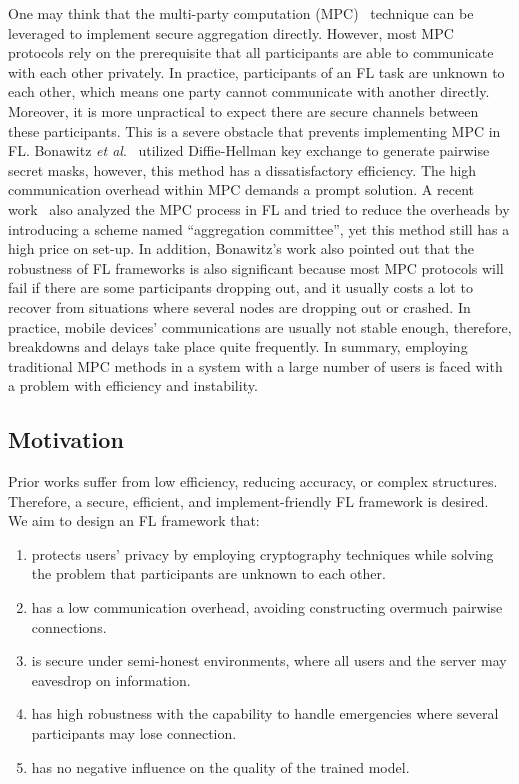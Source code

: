 One may think that the multi-party computation (MPC)~\cite{Yao} technique can be leveraged to implement secure aggregation directly. However, most MPC protocols rely on the prerequisite that all participants are able to communicate with each other privately. In practice, participants of an FL task are unknown to each other, which means one party cannot communicate with another directly. Moreover, it is more unpractical to expect there are secure channels between these participants. This is a severe obstacle that prevents implementing MPC in FL. Bonawitz \emph{et al}.~\cite{Practical} utilized Diffie-Hellman key exchange to generate pairwise secret masks, however, this method has a dissatisfactory efficiency. The high communication overhead within MPC demands a prompt solution. A recent work~\cite{Two-Phase} also analyzed the MPC process in FL and tried to reduce the overheads by introducing a scheme named ``aggregation committee'', yet this method still has a high price on set-up. In addition, Bonawitz's work also pointed out that the robustness of FL frameworks is also significant because most MPC protocols will fail if there are some participants dropping out, and it usually costs a lot to recover from situations where several nodes are dropping out or crashed. In practice, mobile devices' communications are usually not stable enough, therefore, breakdowns and delays take place quite frequently. In summary, employing traditional MPC methods in a system with a large number of users is faced with a problem with efficiency and instability.

\subsection{Motivation} 
Prior works suffer from low efficiency, reducing accuracy, or complex structures. Therefore, a secure, efficient, and implement-friendly FL framework is desired. We aim to design an FL framework that:
\begin{enumerate}
    \item protects users' privacy by employing cryptography techniques while solving the problem that participants are unknown to each other.

    \item has a low communication overhead, avoiding constructing overmuch pairwise connections.

    \item is secure under semi-honest environments, where all users and the server may eavesdrop on information.

    \item has high robustness with the capability to handle emergencies where several participants may lose connection.

    \item has no negative influence on the quality of the trained model.
\end{enumerate}


